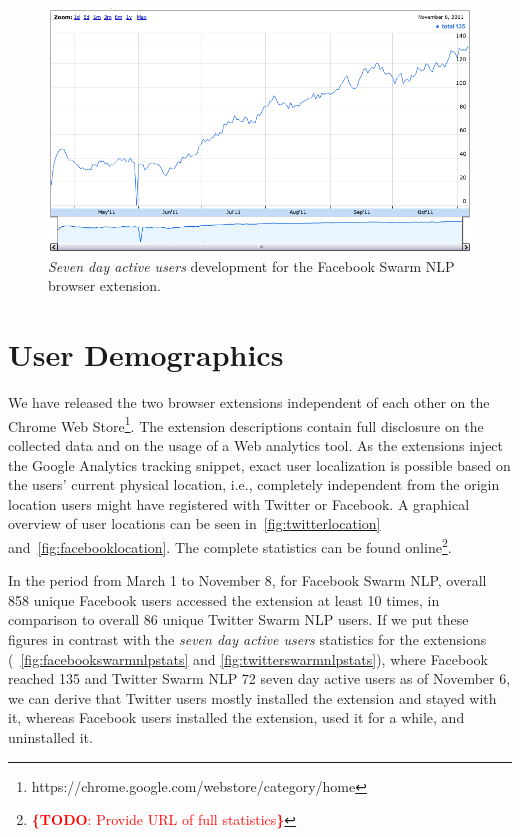 \documentclass{iosart2c}
\newcommand{\todo}[1]{\noindent\textcolor{red}{{\bf \{TODO}: #1{\bf \}}}}
\begin{document}
\begin{figure}
\centering
\includegraphics[width=1.0\linewidth]{./resources/facebookswarmnlpstats.png}
\caption{\textit{Seven day active users} development for the Facebook Swarm NLP browser extension.}
\label{fig:facebookswarmnlpstats}
\end{figure}

\section{User Demographics} \label{sec:userdemographics}
We have released the two browser extensions independent of each other on the Chrome Web Store\footnote{https://chrome.google.com/webstore/category/home}. The extension descriptions contain full disclosure on the collected data and on the usage of a Web analytics tool. As the extensions inject the Google Analytics tracking snippet, exact user localization is possible based on the users' current physical location, i.e., completely independent from the origin location users might have registered with Twitter or Facebook. A graphical overview of user locations can be seen in~\autoref{fig:twitterlocation} and~\autoref{fig:facebooklocation}. The complete statistics can be found online\footnote{\todo{Provide URL of full statistics}}.

In the period from March 1 to November 8, for Facebook Swarm NLP, overall 858 unique Facebook users accessed the extension at least 10 times, in comparison to overall 86 unique Twitter Swarm NLP users. If we put these figures in contrast with the \emph{seven day active users} statistics for the extensions (~\autoref{fig:facebookswarmnlpstats} and \autoref{fig:twitterswarmnlpstats}), where Facebook reached 135 and Twitter Swarm NLP 72 seven day active users as of November 6, we can derive that Twitter users mostly installed the extension and stayed with it, whereas Facebook users installed the extension, used it for a while, and uninstalled it.
\end{document}
